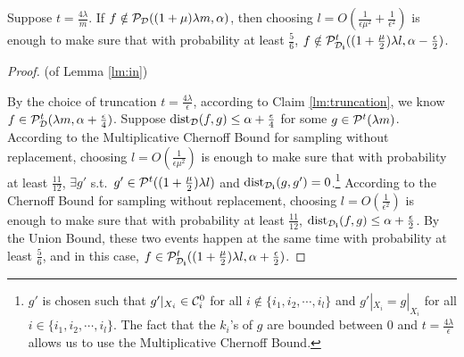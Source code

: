 \begin{lemma}
\label{lm:notin}
Suppose $t=\frac{4\lambda}{m}$. If $f\notin{\mathcal{P}}_{{\mathcal{D}}}((1+\mu)\lambda m,\alpha)$, then choosing $l=O(\frac{1}{\epsilon\mu^2}+\frac{1}{\epsilon^2})$ is enough to make sure that with probability at least $\frac{5}{6}$, $f\notin{\mathcal{P}}^{t}_{{\mathcal{D}}_{\mathbf i}}((1+\frac{\mu}{2})\lambda l,\alpha-\frac{\epsilon}{2})$.
\end{lemma}


\begin{proof}(of Lemma \ref{lm:in})

By the choice of truncation $t=\frac{4\lambda}{\epsilon}$, according to Claim \ref{lm:truncation}, we know $f\in{\mathcal{P}}^t_{{\mathcal{D}}}(\lambda m,\alpha+\frac{\epsilon}{4})$. Suppose ${\mathrm{dist}}_{{\mathcal{D}}}(f,g)\leq \alpha+\frac{\epsilon}{4}$ for some $g\in{\mathcal{P}}^t(\lambda m)$. According to the Multiplicative Chernoff Bound for sampling without replacement, choosing $l=O(\frac{1}{\epsilon\mu^2})$ is enough to make sure that with probability at least $\frac{11}{12}$, $\exists g'$ s.t.\ $g'\in{\mathcal{P}}^{t}((1+\frac{\mu}{2})\lambda l)$ and ${\mathrm{dist}}_{{\mathcal{D}}_{\mathbf i}}(g,g')=0$.\footnote{$g'$ is chosen such that $g'|_{X_{i}}\in{\mathcal{C}}_{i}^0$ for all $i\notin \{i_1,i_2,\cdots,i_l\}$ and $g'|_{X_{i}}=g|_{X_{i}}$ for all $i\in\{i_1,i_2,\cdots,i_l\}$. The fact that the $k_i$'s of $g$ are bounded between 0 and $t=\frac{4\lambda}{\epsilon}$ allows us to use the Multiplicative Chernoff Bound.} According to the Chernoff Bound for sampling without replacement, choosing $l=O(\frac{1}{\epsilon^2})$ is enough to make sure that with probability at least $\frac{11}{12}$, ${\mathrm{dist}}_{{\mathcal{D}}_{\mathbf i}}(f,g)\leq\alpha+\frac{\epsilon}{2}$. By the Union Bound, these two events happen at the same time with probability at least $\frac{5}{6}$, and in this case, $f\in{\mathcal{P}}^{t}_{{\mathcal{D}}_{\mathbf i}}((1+\frac{\mu}{2})\lambda l,\alpha+\frac{\epsilon}{2})$. 
\end{proof}

